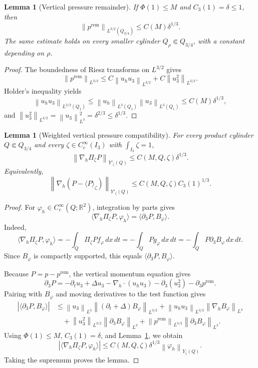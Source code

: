 \documentclass[pdflatex,sn-mathphys-num]{sn-jnl}
\numberwithin{equation}{section}
\theoremstyle{thmstyleone}
\newtheorem{lemma}[theorem]{Lemma}
\theoremstyle{thmstylethree}
\newcommand{\R}{\mathbb R}
\newcommand{\dxdt}{\,dx\,dt}
\newcommand{\nabh}{\nabla_h}
\newcommand{\norm}[2]{\left\|#1\right\|_{#2}}
\newcommand{\rem}{\mathrm{rem}}
\begin{document}
\begin{lemma}[Vertical pressure remainder]
\label{lem:vertical-pressure-remainder}
If \(\Phi(1)\le M\) and \(C_3(1)=\delta\le1\), then
\[
        \norm{p^{\rem}}{L^{3/2}(Q_{3/4})}
        \le C(M)\delta^{1/3}.
\]
The same estimate holds on every smaller cylinder \(Q_\rho\Subset Q_{3/4}\), with a constant depending on \(\rho\).
\end{lemma}

\begin{proof}
The boundedness of Riesz transforms on \(L^{3/2}\) gives
\[
        \norm{p^{\rem}}{L^{3/2}}
        \le C\norm{u_hu_3}{L^{3/2}}+C\norm{u_3^2}{L^{3/2}}.
\]
Holder's inequality yields
\[
        \norm{u_hu_3}{L^{3/2}(Q_1)}
        \le \norm{u_h}{L^3(Q_1)}\norm{u_3}{L^3(Q_1)}
        \le C(M)\delta^{1/3},
\]
and \(\norm{u_3^2}{L^{3/2}}=\norm{u_3}{L^3}^2=\delta^{2/3}\le\delta^{1/3}\).
\end{proof}

\begin{lemma}[Weighted vertical pressure compatibility]
\label{lem:weighted-compatibility}
For every product cylinder \(Q\Subset Q_{3/4}\) and every \(\zeta\in C_c^\infty(I_3)\) with \(\int_{I_3}\zeta=1\),
\[
        \norm{\nabh\Pi_\zeta P}{Y'_\zeta(Q)}
        \le C(M,Q,\zeta)\delta^{1/3}.
\]
Equivalently,
\[
        \norm{\nabh(P-\langle P\rangle_\zeta)}{Y'_\zeta(Q)}
        \le C(M,Q,\zeta)C_3(1)^{1/3}.
\]
\end{lemma}

\begin{proof}
For \(\varphi_h\in C_c^\infty(Q;\R^2)\), integration by parts gives
\begin{equation}
        \langle\nabh\Pi_\zeta P,\varphi_h\rangle
        =\langle\partial_3P,B_\varphi\rangle.
        \label{eq:vertical-antiderivative-identity}
\end{equation}
Indeed,
\[
\langle\nabh\Pi_\zeta P,\varphi_h\rangle
= -\int_Q \Pi_\zeta P f_\varphi\dxdt
= -\int_Q P g_\varphi\dxdt
= -\int_Q P\partial_3B_\varphi\dxdt.
\]
Since \(B_\varphi\) is compactly supported, this equals \(\langle\partial_3P,B_\varphi\rangle\).

Because \(P=p-p^{\rem}\), the vertical momentum equation gives
\[
\partial_3P
= -\partial_tu_3+\Delta u_3-\nabh\cdot(u_hu_3)-\partial_3(u_3^2)-\partial_3p^{\rem}.
\]
Pairing with \(B_\varphi\) and moving derivatives to the test function gives
\[
\begin{aligned}
|\langle\partial_3P,B_\varphi\rangle|
&\le \norm{u_3}{L^3}\norm{(\partial_t+\Delta)B_\varphi}{L^{3/2}}
+\norm{u_hu_3}{L^{3/2}}\norm{\nabh B_\varphi}{L^3}\\
&\quad +\norm{u_3^2}{L^{3/2}}\norm{\partial_3B_\varphi}{L^3}
+\norm{p^{\rem}}{L^{3/2}}\norm{\partial_3B_\varphi}{L^3}.
\end{aligned}
\]
Using \(\Phi(1)\le M\), \(C_3(1)=\delta\), and Lemma~\ref{lem:vertical-pressure-remainder}, we obtain
\[
        |\langle\nabh\Pi_\zeta P,\varphi_h\rangle|
        \le C(M,Q,\zeta)\delta^{1/3}\norm{\varphi_h}{Y_\zeta(Q)}.
\]
Taking the supremum proves the lemma.
\end{proof}
\end{document}
